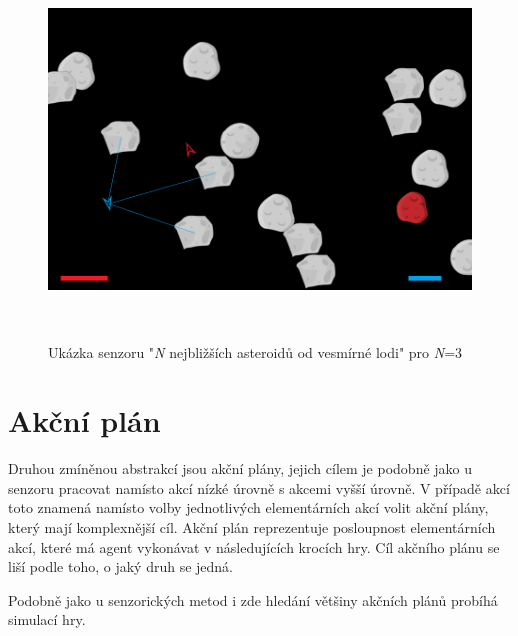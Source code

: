 \begin{figure}[hp]

\includegraphics[width=145mm, height=100mm]{./Obrazky/N_nearest_asteroids.png}
\caption{Ukázka senzoru "\emph{N} nejbližších asteroidů od vesmírné lodi" pro \emph{N}=3}
\label{obr02:}
\end{figure}


\section{Akční plán}
Druhou zmíněnou abstrakcí jsou akční plány, jejich cílem je podobně jako u senzoru pracovat namísto akcí nízké úrovně s akcemi vyšší úrovně. V případě akcí toto znamená namísto volby jednotlivých elementárních akcí volit akční plány, který mají komplexnější cíl.
Akční plán reprezentuje posloupnost elementárních akcí, které má agent vykonávat v následujících krocích hry.
Cíl akčního plánu se liší podle toho, o jaký druh se jedná.
\par
Podobně jako u senzorických metod i zde hledání většiny akčních plánů probíhá simulací hry.

